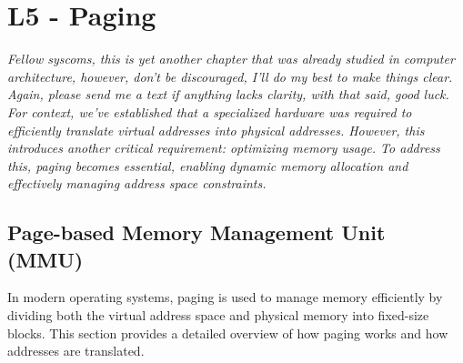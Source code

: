 \chapter{L5 - Paging}
\textit{Fellow syscoms, this is yet another chapter that was already studied in computer architecture, however, don't be discouraged, I'll do my best to make things clear. Again, please send me a text if anything lacks clarity, with that said, good luck.}\\[5px]
\textit{For context, we've established that a specialized hardware was required to efficiently translate virtual addresses into physical addresses. However, this introduces another critical requirement: optimizing memory usage. To address this, paging becomes essential, enabling dynamic memory allocation and effectively managing address space constraints.}
\vfill
\section{Page-based Memory Management Unit (MMU)}
In modern operating systems, paging is used to manage memory efficiently by dividing both the virtual address space and physical memory into fixed-size blocks. This section provides a detailed overview of how paging works and how addresses are translated.


